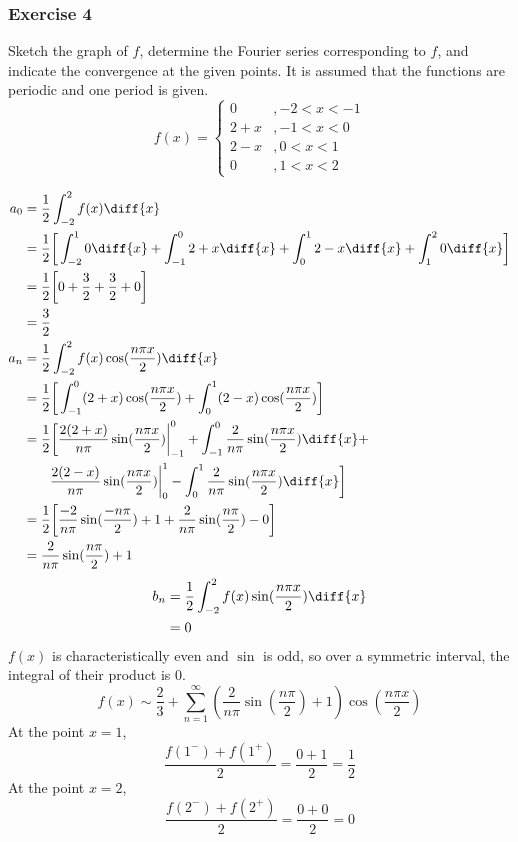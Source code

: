 \documentclass{math}
\begin{document}
\subsubsection*{Exercise 4}
Sketch the graph of \( f \), determine the Fourier series corresponding to
\( f \), and indicate the convergence at the given points. It is assumed that
the functions are periodic and one period is given.
\[ f(x) = \begin{cases}
  0 &, -2<x<-1 \\
  2+x &, -1<x<0 \\
  2-x &, 0<x<1 \\
  0 &, 1<x<2
\end{cases} \]
\begin{center}
\end{center}
\begin{align*}
  a_0 &= \frac{1}{2}\int_{-2}^{2}f(x)\diff{x} \\
  &= \frac{1}{2}\bigg[\int_{-2}^{1}0\diff{x}+\int_{-1}^{0}2+x\diff{x}+
    \int_{0}^{1}2-x\diff{x}+\int_{1}^{2}0\diff{x}\bigg] \\
  &= \frac{1}{2}\bigg[0+\frac{3}{2}+\frac{3}{2}+0\bigg] \\
  &= \frac{3}{2} \\
  a_n &= \frac{1}{2}\int_{-2}^{2}f(x)\cos(\frac{n\pi x}{2})\diff{x} \\
  &= \frac{1}{2}\bigg[\int_{-1}^{0}(2+x)\cos(\frac{n\pi x}{2})+
    \int_{0}^{1}(2-x)\cos(\frac{n\pi x}{2})\bigg] \\
  &= \frac{1}{2}\bigg[
    \frac{2(2+x)}{n\pi}\sin(\frac{n\pi x}{2})\bigg|_{-1}^0+
    \int_{-1}^{0}\frac{2}{n\pi}\sin(\frac{n\pi x}{2})\diff{x}+ \\
  & \quad \quad \frac{2(2-x)}{n\pi}\sin(\frac{n\pi x}{2})\bigg|_{0}^{1}-
    \int_{0}^{1}\frac{2}{n\pi}\sin(\frac{n\pi x}{2})\diff{x}
  \bigg] \\
  &= \frac{1}{2}\bigg[\frac{-2}{n\pi}\sin(\frac{-n\pi}{2})+1+
    \frac{2}{n\pi}\sin(\frac{n\pi}{2})-0\bigg] \\
  &= \frac{2}{n\pi}\sin(\frac{n\pi}{2})+1
\end{align*}
\begin{align*}
  b_n &= \frac{1}{2}\int_{-2}^{2}f(x)\sin(\frac{n\pi x}{2})\diff{x} \\
  &= 0
\end{align*}
\( f(x) \) is characteristically even and \( \sin \) is odd, so over a
symmetric interval, the integral of their product is 0.
\[ f(x) \sim \frac{2}{3}+\sum_{n=1}^{\infty}
  (\frac{2}{n\pi}\sin(\frac{n\pi}{2})+1)\cos(\frac{n\pi x}{2}) \]
At the point \( x = 1 \),
\[ \frac{f(1^-)+f(1^+)}{2} = \frac{0+1}{2} = \frac{1}{2} \]
At the point \( x = 2 \),
\[ \frac{f(2^-)+f(2^+)}{2} = \frac{0+0}{2} = 0 \]
\end{document}

